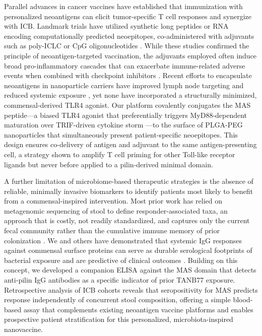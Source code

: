 \documentclass{article}
\begin{document}
Parallel advances in cancer vaccines have established that immunization with personalized neoantigens can elicit tumor-specific T cell responses and synergize with ICB. Landmark trials have utilized synthetic long peptides or RNA encoding computationally predicted neoepitopes, co-administered with adjuvants such as poly-ICLC \cite{ott2017personalized,sahin2017personalized} or CpG oligonucleotides \cite{keskin2019neoantigen}. While these studies confirmed the principle of neoantigen-targeted vaccination, the adjuvants employed often induce broad pro-inflammatory cascades that can exacerbate immune-related adverse events when combined with checkpoint inhibitors \cite{rodriguez2020tlr4}. Recent efforts to encapsulate neoantigens in nanoparticle carriers have improved lymph node targeting and reduced systemic exposure \cite{hu2018nanoparticle,zhu2017neoantigen}, yet none have incorporated a structurally minimized, commensal-derived TLR4 agonist. Our platform covalently conjugates the MAS peptide—a biased TLR4 agonist that preferentially triggers MyD88-dependent maturation over TRIF-driven cytokine storm \cite{bowen2019tlr4}—to the surface of PLGA-PEG nanoparticles that simultaneously present patient-specific neoepitopes. This design ensures co-delivery of antigen and adjuvant to the same antigen-presenting cell, a strategy shown to amplify T cell priming for other Toll-like receptor ligands \cite{lynn2015influenza} but never before applied to a pilin-derived minimal domain.

A further limitation of microbiome-based therapeutic strategies is the absence of reliable, minimally invasive biomarkers to identify patients most likely to benefit from a commensal-inspired intervention. Most prior work has relied on metagenomic sequencing of stool to define responder-associated taxa, an approach that is costly, not readily standardized, and captures only the current fecal community rather than the cumulative immune memory of prior colonization \cite{sivan2015commensal}. We and others have demonstrated that systemic IgG responses against commensal surface proteins can serve as durable serological footprints of bacterial exposure and are predictive of clinical outcomes \cite{fluckiger2020cross}. Building on this concept, we developed a companion ELISA against the MAS domain that detects anti-pilin IgG antibodies as a specific indicator of prior TANB77 exposure. Retrospective analysis of ICB cohorts reveals that seropositivity for MAS predicts response independently of concurrent stool composition, offering a simple blood-based assay that complements existing neoantigen vaccine platforms and enables prospective patient stratification for this personalized, microbiota-inspired nanovaccine.
\end{document}
